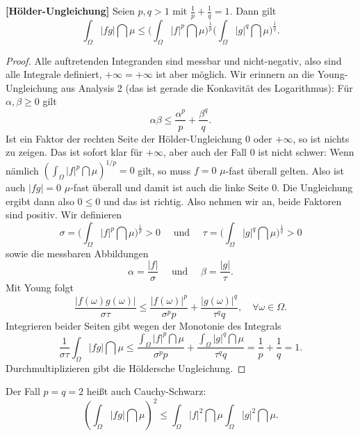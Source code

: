 \begin{satz}\label{hoelder}
 \textbf{[Hölder-Ungleichung]}
	Seien $p,q > 1$ mit $ \frac{1}{p} + \frac{1}{q} = 1$. Dann gilt 
	\[ \int_{\Omega} |fg| \dint \mu \leq \Big( \int_{\Omega} |f|^p \dint \mu \Big)^{\frac{1}{p}} \Big( \int_{\Omega} |g|^q \dint \mu \Big)^{\frac{1}{q}}. \]
\end{satz}

\begin{proof}
		 Alle auftretenden Integranden sind messbar und nicht-negativ, also sind alle Integrale definiert, $+\infty = +\infty$ ist aber möglich. Wir erinnern an die Young-Ungleichung aus Analysis 2 (das ist gerade die Konkavit\"at des Logarithmus): F\"ur $\alpha, \beta \geq 0$ gilt
		\[ \alpha \beta \leq \frac{\alpha^p}{p} + \frac{\beta^q}{q}. \]
		 Ist ein Faktor der rechten Seite der H\"older-Ungleichung $0$ oder $+ \infty$, so ist nichts zu zeigen. Das ist sofort klar für $+\infty$, aber auch der Fall $0$ ist nicht schwer: Wenn n\"amlich
		$ (\int_{\Omega} |f|^p \dint \mu )^{1/p}= 0$ gilt, so muss $f = 0$ $\mu$-fast überall gelten. Also ist auch $|fg| = 0$ $\mu$-fast überall und damit ist auch die linke Seite $0$. Die Ungleichung ergibt dann also $0\leq 0$ und das ist richtig.
		Also nehmen wir an, beide Faktoren sind positiv. Wir definieren \[ \sigma = \Big( \int_{\Omega} |f|^p \dint \mu \Big)^{\frac{1}{p}} > 0\quad \text{ und } \quad \tau = \Big( \int_{\Omega} |g|^q \dint \mu \Big)^{\frac{1}{q}} > 0 \]
		sowie die messbaren Abbildungen
		\[ \alpha =  \frac{|f|}{\sigma} \quad \text{ und }\quad \beta =  \frac{|g|}{\tau}.\]
		Mit Young folgt \[ \frac{|f(\omega) g(\omega)|}{\sigma \tau} \leq \frac{|f(\omega)|^p}{\sigma^p p} + \frac{|g(\omega)|^q}{\tau^q q},\quad \forall \omega\in \Omega. \]
		Integrieren beider Seiten gibt wegen der Monotonie des Integrals
		\[ \frac{1}{\sigma \tau} \int_{\Omega} |fg| \dint \mu \leq \frac{\int_{\Omega}|f|^p \dint \mu}{\sigma^p p} + \frac{\int_{\Omega}|g|^q \dint \mu}{\tau^q q} = \frac{1}{p} + \frac{1}{q} = 1. \]
		Durchmultiplizieren gibt die H\"oldersche Ungleichung.
\end{proof}
		 Der Fall $p=q=2$ hei\ss t auch Cauchy-Schwarz:
		\[ \left(\int_{\Omega} |fg| \dint\mu  \right)^2 \leq \int_{\Omega} |f|^2 \dint\mu \int_{\Omega} |g|^2 \dint\mu. \]


